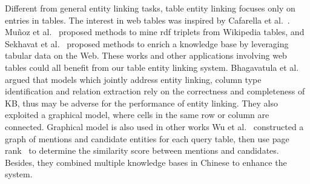 Different from general entity linking tasks, table entity linking focuses only on entries in tables. The interest in web tables was inspired by Cafarella et al.~. 
Mu{\~n}oz et al.~ proposed methods to mine rdf triplets from Wikipedia tables, and Sekhavat et al.~ proposed methods to enrich a knowledge base by leveraging tabular data on the Web. These works and other applications involving web tables could all benefit from our table entity linking system.
Bhagavatula et al.~ argued that models which jointly address entity linking, column type identification and relation extraction rely on the correctness and completeness of KB, thus may be adverse for the performance of entity linking. They also exploited a graphical model, where cells in the same row or column are connected. Graphical model is also used in other works \cite{limaye2010annotating,ibrahim2016making}
Wu et al.~ constructed a graph of mentions and candidate entities for each query table, then use page rank~\cite{page1999pagerank} to determine the similarity score between mentions and candidates. Besides, they combined multiple knowledge bases in Chinese to enhance the system.

